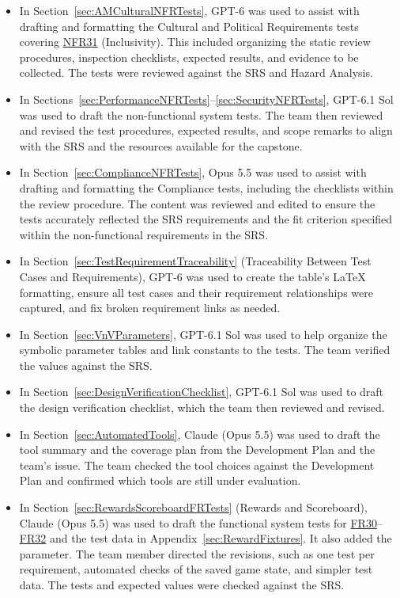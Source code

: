 \documentclass[10pt,titlepage]{article}
\newcommand{\srsurl}{https://team-hindsight.github.io/ophthamology-game/SRS/SRS.pdf}
\newcommand{\srsfrref}[2]{\href{\srsurl\#nameddest=#1}{FR#2}}
\newcommand{\srsnfrref}[2]{\href{\srsurl\#nameddest=#1}{NFR#2}}
\newcommand{\constref}[1]{\hyperlink{const:#1}{\texttt{\detokenize{#1}}}}
\begin{document}
\begin{itemize}
  \item In Section~\ref{sec:AMCulturalNFRTests}, GPT-6 was used to assist
  with drafting and formatting the Cultural and Political
  Requirements tests covering \srsnfrref{NFR_Inclusivity}{31} (Inclusivity). This included
  organizing the static review procedures, inspection checklists,
  expected results, and evidence to be collected. The tests were
  reviewed against the SRS and Hazard Analysis.

  \item In Sections~\ref{sec:PerformanceNFRTests}--\ref{sec:SecurityNFRTests},
  GPT-6.1 Sol was used to draft the non-functional system tests. The team then
  reviewed and revised the test procedures, expected results, and scope remarks
  to align with the SRS and the resources available for the capstone.

  \item In Section~\ref{sec:ComplianceNFRTests}, Opus 5.5 was used to assist with drafting and
  formatting the Compliance tests, including the checklists within the review procedure. The content was 
  reviewed and edited to ensure the tests accurately reflected the SRS requirements and the fit criterion 
  specified within the non-functional requirements in the SRS.

  \item In Section~\ref{sec:TestRequirementTraceability} (Traceability Between
  Test Cases and Requirements), GPT-6 was used to create the table's
  \LaTeX{} formatting, ensure all test cases and their requirement relationships
  were captured, and fix broken requirement links as needed.

  \item In Section~\ref{sec:VnVParameters}, GPT-6.1 Sol was used to help
  organize the symbolic parameter tables and link constants to the tests.
  The team verified the values against the SRS.

  \item In Section~\ref{sec:DesignVerificationChecklist}, GPT-6.1 Sol was used
  to draft the design verification checklist, which the team then reviewed
  and revised.

  \item In Section~\ref{sec:AutomatedTools}, Claude (Opus 5.5) was used to draft
  the tool summary and the coverage plan from the Development Plan and the
  team's issue. The team checked the tool choices against the Development Plan
  and confirmed which tools are still under evaluation.

  \item In Section~\ref{sec:RewardsScoreboardFRTests} (Rewards and Scoreboard),
  Claude (Opus 5.5) was used to draft the functional system tests for
  \srsfrref{FR_FirstReward}{30}--\srsfrref{FR_Scoreboard}{32} and the test data in Appendix~\ref{sec:RewardFixtures}. It also
  added the \constref{REPLAY_TRIALS_MIN} parameter. The team member directed
  the revisions, such as one test per requirement, automated checks of the
  saved game state, and simpler test data. The tests and expected values were
  checked against the SRS.


\end{itemize}
\end{document}

